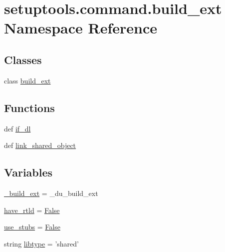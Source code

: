 \hypertarget{namespacesetuptools_1_1command_1_1build__ext}{}\section{setuptools.\+command.\+build\+\_\+ext Namespace Reference}
\label{namespacesetuptools_1_1command_1_1build__ext}
\subsection*{Classes}
\begin{DoxyCompactItemize}
\item 
class \hyperlink{classsetuptools_1_1command_1_1build__ext_1_1build__ext}{build\+\_\+ext}
\end{DoxyCompactItemize}
\subsection*{Functions}
\begin{DoxyCompactItemize}
\item 
def \hyperlink{namespacesetuptools_1_1command_1_1build__ext_ad360eb77dab8a1b12690da0e59500b8a}{if\+\_\+dl}
\item 
def \hyperlink{namespacesetuptools_1_1command_1_1build__ext_ae1d8c5ecf5b3e73b2180336151beae3f}{link\+\_\+shared\+\_\+object}
\end{DoxyCompactItemize}
\subsection*{Variables}
\begin{DoxyCompactItemize}
\item 
\hyperlink{namespacesetuptools_1_1command_1_1build__ext_a608cc05f8cd4907b6a14eb5971f7876d}{\+\_\+build\+\_\+ext} = \+\_\+du\+\_\+build\+\_\+ext
\item 
\hyperlink{namespacesetuptools_1_1command_1_1build__ext_a5ed03ad14d556bf6095784ca350772e7}{have\+\_\+rtld} = \hyperlink{libqhull_8h_a306ebd41c0cd1303b1372c6153f0caf8}{False}
\item 
\hyperlink{namespacesetuptools_1_1command_1_1build__ext_a5f734b107b494b1b3c14089cb6087e65}{use\+\_\+stubs} = \hyperlink{libqhull_8h_a306ebd41c0cd1303b1372c6153f0caf8}{False}
\item 
string \hyperlink{namespacesetuptools_1_1command_1_1build__ext_ac22854f97d7214647dc62d6748af00fb}{libtype} = 'shared'
\end{DoxyCompactItemize}


